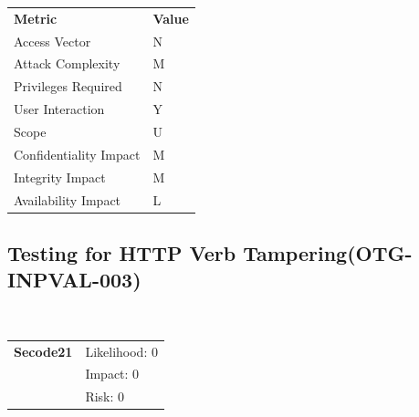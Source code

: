 \documentclass[headsepline,footsepline,footinclude=false,oneside,fontsize=11pt,paper=a4,listof=totoc,bibliography=totoc]{scrbook} %
\begin{document}
\vspace{0.5cm}
\begin{center}
	\begin{tabular}{ll}
		\rowcolor[HTML]{34CDF9}
		{\color[HTML]{ECF4FF} \textbf{Metric}}        & {\color[HTML]{ECF4FF} \textbf{Value}} \\
		\rowcolor[HTML]{BBDAFF}
		{\color[HTML]{333333} Access Vector}          & {\color[HTML]{333333} N}               \\
		\rowcolor[HTML]{ECF4FF}
		{\color[HTML]{333333} Attack Complexity}      & {\color[HTML]{333333} M}               \\
		\rowcolor[HTML]{BBDAFF}
		{\color[HTML]{333333} Privileges Required}    & {\color[HTML]{333333} N}               \\
		\rowcolor[HTML]{ECF4FF}
		{\color[HTML]{333333} User Interaction}       & {\color[HTML]{333333} Y}               \\
		\rowcolor[HTML]{BBDAFF}
		{\color[HTML]{333333} Scope}                  & {\color[HTML]{333333} U}               \\
		\rowcolor[HTML]{ECF4FF}
		{\color[HTML]{333333} Confidentiality Impact} & {\color[HTML]{333333} M}               \\
		\rowcolor[HTML]{BBDAFF}
		{\color[HTML]{333333} Integrity Impact}       & {\color[HTML]{333333} M}               \\
		\rowcolor[HTML]{ECF4FF}
		{\color[HTML]{333333} Availability Impact}    & {\color[HTML]{333333} L}
	\end{tabular}
\end{center}
\pagebreak
\subsection{Testing for HTTP Verb Tampering(OTG-INPVAL-003)}\


\begin{tabular}{cR{12cm}}
	\textbf{Secode21} & Likelihood: 0\\& Impact: 0\\& Risk: 0
\end{tabular}
\end{document}
